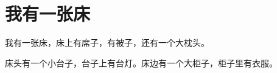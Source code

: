 \documentclass[12pt,UTF-8,openany]{ctexbook}
\begin{document}
\clearpage

\begin{center}
    
\end{center}


\hanzibox{}\hanzibox{}\hanzibox{}\hanzibox{}\hspace{1em}\hanzibox{}\hanzibox{}\hanzibox{}\hanzibox{}

\hanzibox{}\hanzibox{}\hanzibox{}\hanzibox{}\hspace{1em}\hanzibox{}\hanzibox{}\hanzibox{}\hanzibox{}

\hanzibox{}\hanzibox{}\hanzibox{}\hanzibox{}\hspace{1em}




\chapter{我有一张床}

\begin{large}
    
    我有一张床，床上有席子，有被子，还有一个大枕头。
    
    床头有一个小台子，台子上有台灯。床边有一个大柜子，柜子里有衣服。
    
\end{large}


\clearpage

\begin{center}
    
\end{center}


\hanzibox{}\hanzibox{}\hanzibox{}\hanzibox{}\hspace{1em}\hanzibox{}\hanzibox{}\hanzibox{}\hanzibox{}

\hanzibox{}\hanzibox{}\hanzibox{}\hanzibox{}\hspace{1em}\hanzibox{}\hanzibox{}\hanzibox{}\hanzibox{}

\hanzibox{}\hanzibox{}\hanzibox{}\hanzibox{}\hspace{1em}\hanzibox{}\hanzibox{}\hanzibox{}\hanzibox{}
\end{document}
